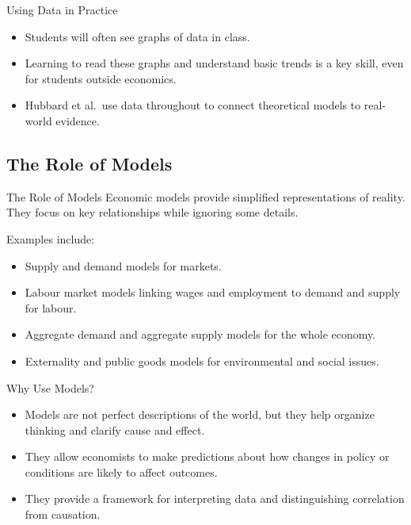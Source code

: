\documentclass[aspectratio=169]{beamer}
\begin{document}
\begin{frame}{Using Data in Practice}
  \transfade
  \begin{itemize}[<+->]
    \item Students will often see graphs of data in class.
    \item Learning to read these graphs and understand basic trends is a key skill, even for
    students outside economics.
    \item Hubbard et al.\ use data throughout to connect theoretical models to real-world evidence.
  \end{itemize}
\end{frame}

\subsection{The Role of Models}

\begin{frame}{The Role of Models}
  \transfade
  Economic models provide simplified representations of reality. They focus on key relationships
  while ignoring some details.

  \vspace{0.2cm}
  Examples include:
  \begin{itemize}[<+->]
    \item Supply and demand models for markets.
    \item Labour market models linking wages and employment to demand and supply for labour.
    \item Aggregate demand and aggregate supply models for the whole economy.
    \item Externality and public goods models for environmental and social issues.
  \end{itemize}
\end{frame}

\begin{frame}{Why Use Models?}
  \transfade
  \begin{itemize}[<+->]
    \item Models are not perfect descriptions of the world, but they help organize thinking and
    clarify cause and effect.
    \item They allow economists to make predictions about how changes in policy or conditions
    are likely to affect outcomes.
    \item They provide a framework for interpreting data and distinguishing correlation from causation.
  \end{itemize}
\end{frame}
\end{document}
